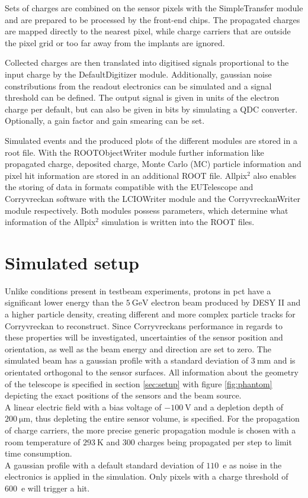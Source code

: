 Sets of charges are combined on the sensor pixels with the SimpleTransfer module and are prepared  to be processed by the front-end chips. The
propagated charges are mapped directly to the nearest pixel, while charge carriers that are outside the pixel grid or too far away from the implants are ignored.

Collected charges are then translated into digitised signals proportional to the input charge by the DefaultDigitizer module. Additionally, gaussian noise constributions
from the readout electronics can be simulated and a signal threshold can be defined. The output signal is given in units of the electron charge per default, but
can also be given in bits by simulating a QDC converter. Optionally, a gain factor and gain smearing can be set.

Simulated events and the produced plots of the different modules are stored in a root file. With the ROOTObjectWriter module further information like propagated charge,
deposited charge, Monte Carlo (MC) particle information and pixel hit information are stored in an additional ROOT file. Allpix$^2$ also enables the storing of
data in formats compatible with the EUTelescope and Corryvreckan software with the LCIOWriter module and the CorryvreckanWriter module respectively. Both modules possess parameters, which
determine what information of the Allpix$^2$ simulation is written into the ROOT files.

\section{Simulated setup}
Unlike conditions present in testbeam experiments, protons in pct have a significant lower energy than the $\SI{5}{\giga\eV}$
electron beam produced by DESY II and a higher particle density, creating different and more complex particle tracks for
Corryvreckan to reconstruct. Since Corryvreckans performance in regards to these properties will be investigated, uncertainties
of the sensor position and orientation, as well as the beam energy and direction are set to zero. The simulated
beam has a gaussian profile with a standard deviation of $\SI{3}{\milli\meter}$ and is orientated orthogonal to the sensor
surfaces. All information about the geometry of the telescope is specified in section \ref{sec:setup} with
figure \ref{fig:phantom} depicting the exact positions of the sensors and the beam source. \\ %
A linear electric field with a bias voltage of $\SI{-100}{\volt}$ and a depletion depth of $\SI{200}{\micro\meter}$,
thus depleting the entire sensor volume, is specified. For the propagation of charge carriers, the more precise generic propagation
module is chosen with a room temperature of $\SI{293}{\kelvin}$ and 300 charges being propagated per step to limit time consumption.\\
A gaussian profile with a default standard deviation of $110$\, e as noise in the electronics is applied in the simulation.
Only pixels with a charge threshold of $600$\, e will trigger a hit.

